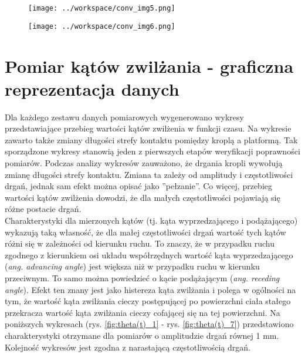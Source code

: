 \documentclass[a4paper,11pt,twoside,openright]{article} %
\begin{document}
\captionsetup{skip=0pt}
 \begin{centering}
\begin{minipage}{0.5\textwidth}
\begin{figure}[H]
\captionsetup{justification=centering}
\begin{center}
\texttt{[image: ../workspace/conv\_img5.png]} 
\end{center}
\end{figure}
\end{minipage}
  \begin{minipage}{0.5\textwidth}
\begin{figure}[H]
\captionsetup{justification=centering}
\begin{center}
\texttt{[image: ../workspace/conv\_img6.png]} 
\end{center}
\end{figure}
\end{minipage} \hfill
\end{centering}
\newpage

\section{Pomiar kątów zwilżania - graficzna reprezentacja danych}
\noindent Dla każdego zestawu danych pomiarowych wygenerowano wykresy przedstawiające przebieg wartości kątów zwilżenia w funkcji czasu. Na wykresie zawarto także zmiany długości strefy kontaktu pomiędzy kroplą a platformą. Tak sporządzone wykresy stanowią jeden z pierwszych etapów weryfikacji poprawności pomiarów. Podczas analizy wykresów zauważono, że drgania kropli wywołują zmianę długości strefy kontaktu. Zmiana ta zależy od amplitudy i częstotliwości drgań, jednak sam efekt można opisać jako ''pełzanie''. Co więcej, przebieg wartości kątów zwilżenia dowodzi, że dla małych częstotliwości pojawiają się różne postacie drgań. \\

\noindent Charakterystyki dla mierzonych kątów (tj. kąta wyprzedzającego i podążającego) wykazują taką własność, że dla małej częstotliwości drgań wartość tych kątów różni się w zależności od kierunku ruchu. To znaczy, że w przypadku ruchu zgodnego z kierunkiem osi układu współrzędnych wartość kąta wyprzedzającego (\textit{ang. advancing angle}) jest większa niż w przypadku ruchu w kierunku przeciwnym. To samo można powiedzieć o kącie podążającym (\textit{ang. receding angle}). Efekt ten znany jest jako histereza kąta zwilżania i polega w ogólności na tym, że wartość kąta zwilżania cieczy postępującej po powierzchni ciała stałego przekracza wartość kąta zwilżania cieczy cofającej się na tej powierzchni. Na poniższych wykresach (rys. \ref{fig:theta(t)_1} - rys. \ref{fig:theta(t)_7}) przedstawiono charakterystyki otrzymane dla pomiarów o amplitudzie drgań równej 1 mm. Kolejność wykresów jest zgodna z narastającą częstotliwością drgań.
\end{document}
